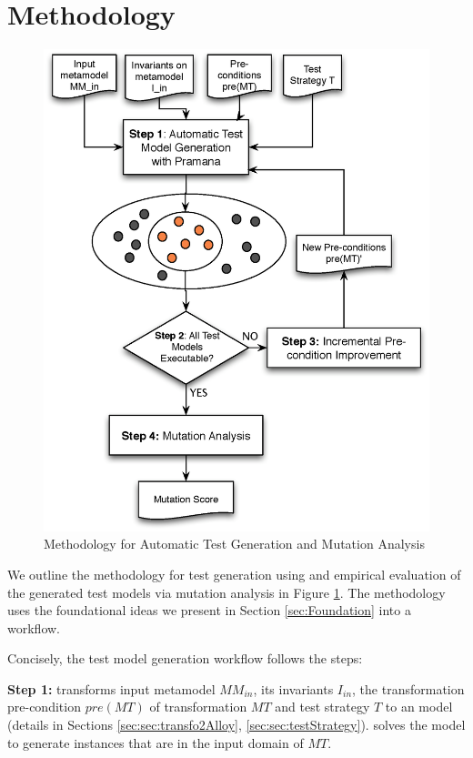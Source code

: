 \section{Methodology}
\label{sec:Methodology}


\begin{figure} [!t]
\begin{center}
\includegraphics[height=5 in]{./figures/methodology.eps}
\end{center}
\caption{Methodology for Automatic Test Generation and Mutation Analysis}
\label{fig:methodology}
\end{figure}

We outline the methodology for test generation  using {\Pramana} and empirical evaluation of the generated test models via mutation analysis in Figure \ref{fig:methodology}. The methodology uses  the foundational ideas we present in Section \ref{sec:Foundation} into a workflow. 

 Concisely, the test model generation workflow follows the steps:

\noindent \textbf{Step 1:} {\Pramana} transforms input metamodel $MM_{in}$, its invariants $I_{in}$, the transformation pre-condition $pre(MT)$ of transformation $MT$ and test strategy $T$ to an {\Alloy} model (details in Sections \ref{sec:sec:transfo2Alloy}, \ref{sec:sec:testStrategy}). {\Pramana} solves the {\Alloy} model to generate instances that are in the input domain of $MT$.

